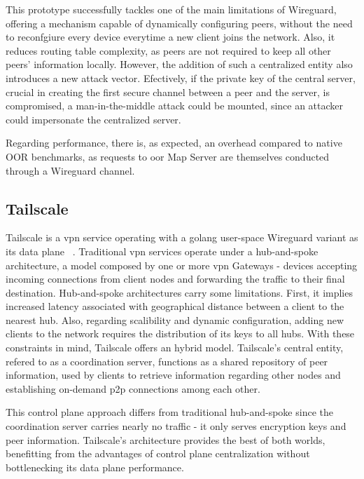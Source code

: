 \documentclass[11pt,twoside,a4paper]{report}
\begin{document}
This prototype successfully tackles one of the main limitations of Wireguard, offering a mechanism capable of dynamically configuring peers, without the need to reconfgiure every device everytime a new client joins the network. Also, it reduces routing table complexity, as peers are not required to keep all other peers' information locally. However, the addition of such a centralized entity also introduces a new attack vector. Efectively, if the private key of the central server, crucial in creating the first secure channel between a peer and the server, is compromised, a man-in-the-middle attack could be mounted, since an attacker could impersonate the centralized server.

Regarding performance, there is, as expected, an overhead compared to native OOR benchmarks, as requests to \acrshort{oor} Map Server are themselves conducted through a Wireguard channel.

\subsection{Tailscale}

Tailscale is a \acrshort{vpn} service operating with a golang user-space Wireguard variant as its data plane ~\cite{tailscale2020online}. Traditional \acrshort{vpn} services operate under a hub-and-spoke architecture, a model composed by one or more \acrshort{vpn} Gateways - devices accepting incoming connections from client nodes and forwarding the traffic to their final destination. Hub-and-spoke architectures carry some limitations. First, it implies increased latency associated with geographical distance between a client to the nearest hub. Also, regarding scalibility and dynamic configuration, adding new clients to the network requires the distribution of its keys to all hubs. With these constraints in mind, Tailscale offers an hybrid model. Tailscale's central entity, refered to as a coordination server, functions as a shared repository of peer information, used by clients to retrieve information regarding other nodes and establishing on-demand \acrshort{p2p} connections among each other.

This control plane approach differs from traditional hub-and-spoke since the coordination server carries nearly no traffic - it only serves encryption keys and peer information. Tailscale's architecture provides the best of both worlds, benefitting from the advantages of control plane centralization without bottlenecking its data plane performance.
\end{document}
